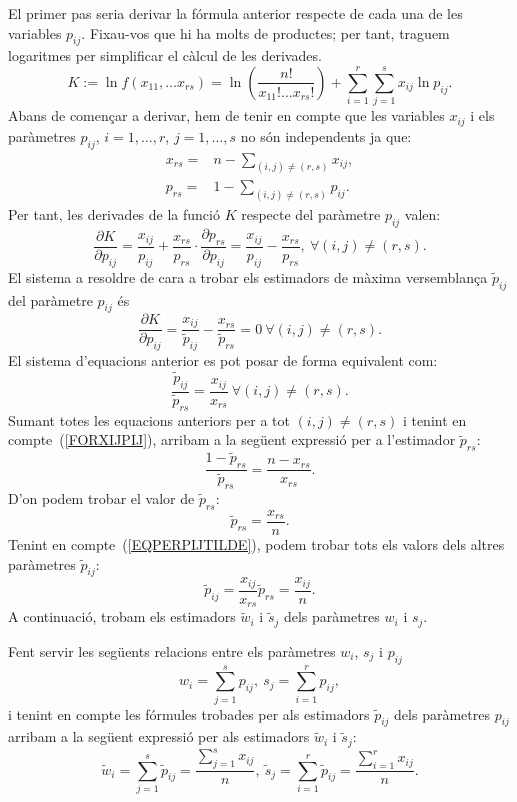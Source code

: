 {El primer pas seria derivar la f\'ormula anterior respecte de cada una de les
variables $p_{ij}$. Fixau-vos que hi ha molts de productes; per tant, 
traguem logaritmes per simplificar el c\`alcul de les derivades.
\[
K:= \ln f(x_{11},\ldots x_{rs})=\ln\left(\frac{n!}{x_{11}!\ldots x_{rs}!}
\right) +\sum_{i=1}^r\sum_{j=1}^s x_{ij} \ln p_{ij}.
\]
Abans de comen\c{c}ar a derivar, hem de tenir en compte que les variables
$x_{ij}$ i els par\`ametres $p_{ij}$,
$i=1,\ldots,r$, $j=1,\ldots, s$ no s\'on independents ja que:
\begin{equation}
\begin{array}{rl}
x_{rs} = & n -\sum\limits_{(i,j)\not =(r,s)} x_{ij}, \\
p_{rs} = & 1 -\sum\limits_{(i,j)\not =(r,s)} p_{ij}.
\end{array}
\label{FORXIJPIJ}
\end{equation}
Per tant, les derivades de la funci\'o $K$ respecte del par\`ametre $p_{ij}$ valen:
\[
\frac{\partial K}{\partial p_{ij}}=\frac{x_{ij}}{p_{ij}}+\frac{x_{rs}}{p_{rs}}\cdot 
\frac{\partial p_{rs}}{\partial p_{ij}}=\frac{x_{ij}}{p_{ij}}-
\frac{x_{rs}}{p_{rs}},\  \forall (i,j)\not =(r,s).
\]
El sistema a resoldre de cara a trobar els estimadors de m\`axima versemblan\c{c}a 
$\tilde{p}_{ij}$ del par\`ametre $p_{ij}$ \'es
\[
\frac{\partial K}{\partial p_{ij}}=\frac{x_{ij}}{\tilde{p}_{ij}}-
\frac{x_{rs}}{\tilde{p}_{rs}}=0\  \forall (i,j)\not =(r,s).
\]
El sistema d'equacions anterior es pot posar de forma equivalent com: 
\begin{equation}
\frac{\tilde{p}_{ij}}{\tilde{p}_{rs}}=\frac{x_{ij}}{x_{rs}}\  \forall (i,j)\not =(r,s).
\label{EQPERPIJTILDE}
\end{equation}
Sumant totes les equacions anteriors per a tot $(i,j)\not =(r,s)$ i 
tenint en compte~(\ref{FORXIJPIJ}), arribam a la seg\"uent expressi\'o 
per a l'estimador $\tilde{p}_{rs}$:
\[
\frac{1-\tilde{p}_{rs}}{\tilde{p}_{rs}}=\frac{n-x_{rs}}{x_{rs}}.
\]
D'on podem trobar el valor de $\tilde{p}_{rs}$:
\[
\tilde{p}_{rs}=\frac{x_{rs}}{n}.
\]
Tenint en compte~(\ref{EQPERPIJTILDE}), podem trobar tots els valors dels altres 
par\`ametres $\tilde{p}_{ij}$:
\[
\tilde{p}_{ij}=\frac{x_{ij}}{x_{rs}}\tilde{p}_{rs} =\frac{x_{ij}}{n}.
\]
A continuaci\'o, trobam els estimadors $\tilde{w}_i$ i $\tilde{s}_j$ dels par\`ametres
$w_i$ i $s_j$.

Fent servir les seg\"uents relacions entre els par\`ametres ${w}_i$, ${s}_j$ i
$p_{ij}$
\[
w_i=\sum_{j=1}^s p_{ij}, \ s_j =\sum_{i=1}^r p_{ij},
\]
i tenint en compte les f\'ormules trobades per als estimadors 
$\tilde{p}_{ij}$ dels 
par\`ametres $p_{ij}$ arribam a la seg\"uent expressi\'o per als estimadors 
$\tilde{w}_i$ i $\tilde{s}_j$:
\[
\tilde{w}_i=\sum_{j=1}^s \tilde{p}_{ij}=\frac{\sum\limits_{j=1}^s x_{ij}}{n}, 
\ \tilde{s}_j =\sum_{i=1}^r \tilde{p}_{ij}=\frac{\sum\limits_{i=1}^r x_{ij}}{n}.
\]
}

